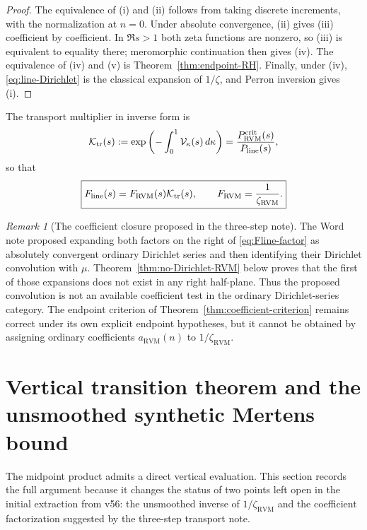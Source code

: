 \documentclass[11pt,reqno]{amsart}
\theoremstyle{definition}
\theoremstyle{remark}
\newtheorem{remark}[theorem]{Remark}
\newcommand{\RVM}{\mathrm{RVM}}
\newcommand{\crit}{\mathrm{crit}}
\newcommand{\linez}{\mathrm{line}}
\begin{document}
\begin{proof}
The equivalence of (i) and (ii) follows from taking discrete increments, with the normalization at $n=0$.  Under absolute convergence, (ii) gives (iii) coefficient by coefficient.  In $\Re s>1$ both zeta functions are nonzero, so (iii) is equivalent to equality there; meromorphic continuation then gives (iv).  The equivalence of (iv) and (v) is Theorem~\ref{thm:endpoint-RH}.  Finally, under (iv), \eqref{eq:line-Dirichlet} is the classical expansion of $1/\zeta$, and Perron inversion gives (i).
\end{proof}

The transport multiplier in inverse form is
\begin{equation}\label{eq:Ktransport}
 \mathcal K_{\rm tr}(s)
 :=\exp\left(-\int_0^1\mathcal V_\kappa(s)\,d\kappa\right)
 =\frac{P_{\RVM}^{\crit}(s)}{P_{\linez}(s)},
\end{equation}
so that
\begin{equation}\label{eq:Fline-factor}
 \boxed{
 F_{\linez}(s)=F_{\RVM}(s)\mathcal K_{\rm tr}(s),
 \qquad F_{\RVM}=\frac1{\zeta_{\RVM}}.}
\end{equation}

\begin{remark}[The coefficient closure proposed in the three-step note]\label{rem:word-coefficient-route}
The Word note proposed expanding both factors on the right of \eqref{eq:Fline-factor} as absolutely convergent ordinary Dirichlet series and then identifying their Dirichlet convolution with $\mu$.  Theorem~\ref{thm:no-Dirichlet-RVM} below proves that the first of those expansions does not exist in any right half-plane.  Thus the proposed convolution is not an available coefficient test in the ordinary Dirichlet-series category.  The endpoint criterion of Theorem~\ref{thm:coefficient-criterion} remains correct under its own explicit endpoint hypotheses, but it cannot be obtained by assigning ordinary coefficients $a_{\RVM}(n)$ to $1/\zeta_{\RVM}$.
\end{remark}

\section{Vertical transition theorem and the unsmoothed synthetic Mertens bound}
\label{sec:transition}

The midpoint product admits a direct vertical evaluation.  This section records the full argument because it changes the status of two points left open in the initial extraction from v56: the unsmoothed inverse of $1/\zeta_{\RVM}$ and the coefficient factorization suggested by the three-step transport note.
\end{document}

